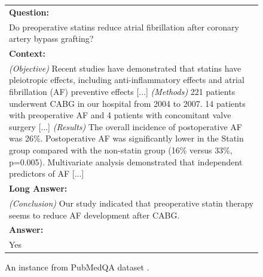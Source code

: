 \documentclass[11pt]{article}
\begin{document}
\begin{figure}
\small
\noindent\begin{tabular}{ |m{7cm}| }
\hline
\textbf{Question:} \\ 
Do preoperative statins reduce atrial fibrillation after coronary artery bypass grafting?  \\ 
\textbf{Context:}  \\ 
\textit{(Objective)} Recent studies have demonstrated that statins have pleiotropic effects, including anti-inflammatory effects and atrial fibrillation (AF) preventive effects [...] \newline
\textit{(Methods)} 221 patients underwent CABG in our hospital from 2004 to 2007. 14 patients with preoperative AF and 4 patients with concomitant valve surgery [...] \newline
\textit{(Results)} The overall incidence of postoperative AF was 26\%. Postoperative AF was significantly lower in the Statin group compared with the non-statin group (16\% versus 33\%, p=0.005). Multivariate analysis demonstrated that independent predictors of AF [...] \\
\textbf{Long Answer:} \\
\textit{(Conclusion)} Our study indicated that preoperative statin therapy seems to reduce AF development after CABG. \\
\textbf{Answer:} \\
Yes \\
\hline
\end{tabular}
\caption{An instance \cite{sakamoto_preoperative_2011} from PubMedQA dataset \cite{jin_pubmedqa_2019}.}
\label{figure:1}
\end{figure}
\end{document}
